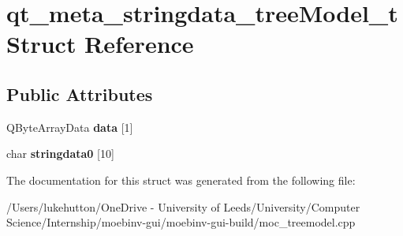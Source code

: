 \hypertarget{structqt__meta__stringdata__tree_model__t}{}\section{qt\+\_\+meta\+\_\+stringdata\+\_\+tree\+Model\+\_\+t Struct Reference}
\label{structqt__meta__stringdata__tree_model__t}
\subsection*{Public Attributes}
\begin{DoxyCompactItemize}
\item 
\mbox{\label{structqt__meta__stringdata__tree_model__t_a7340fecee9939e4fbc0fd7267a1caa96}} 
Q\+Byte\+Array\+Data {\bfseries data} \mbox{[}1\mbox{]}
\item 
\mbox{\label{structqt__meta__stringdata__tree_model__t_adfbf1f4d9bf5384fd42318955a041366}} 
char {\bfseries stringdata0} \mbox{[}10\mbox{]}
\end{DoxyCompactItemize}


The documentation for this struct was generated from the following file\+:\begin{DoxyCompactItemize}
\item 
/\+Users/lukehutton/\+One\+Drive -\/ University of Leeds/\+University/\+Computer Science/\+Internship/moebinv-\/gui/moebinv-\/gui-\/build/moc\+\_\+treemodel.\+cpp\end{DoxyCompactItemize}
